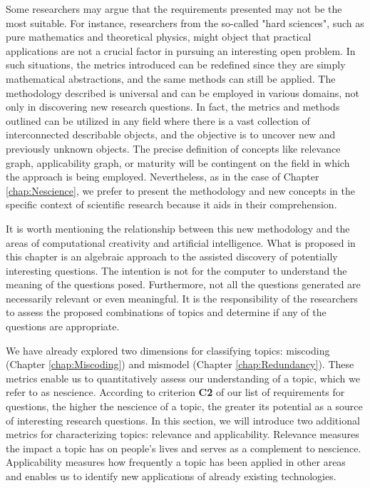 \bigskip

Some researchers may argue that the requirements presented may not be the most suitable. For instance, researchers from the so-called "hard sciences", such as pure mathematics and theoretical physics, might object that practical applications are not a crucial factor in pursuing an interesting open problem. In such situations, the metrics introduced can be redefined since they are simply mathematical abstractions, and the same methods can still be applied. The methodology described is universal and can be employed in various domains, not only in discovering new research questions. In fact, the metrics and methods outlined can be utilized in any field where there is a vast collection of interconnected describable objects, and the objective is to uncover new and previously unknown objects. The precise definition of concepts like relevance graph, applicability graph, or maturity will be contingent on the field in which the approach is being employed. Nevertheless, as in the case of Chapter \ref{chap:Nescience}, we prefer to present the methodology and new concepts in the specific context of scientific research because it aids in their comprehension.

It is worth mentioning the relationship between this new methodology and the areas of computational creativity and artificial intelligence. What is proposed in this chapter is an algebraic approach to the assisted discovery of potentially interesting questions. The intention is not for the computer to understand the meaning of the questions posed. Furthermore, not all the questions generated are necessarily relevant or even meaningful. It is the responsibility of the researchers to assess the proposed combinations of topics and determine if any of the questions are appropriate.

We have already explored two dimensions for classifying topics: miscoding (Chapter \ref{chap:Miscoding}) and mismodel (Chapter \ref{chap:Redundancy}). These metrics enable us to quantitatively assess our understanding of a topic, which we refer to as nescience. According to criterion \textbf{C2} of our list of requirements for questions, the higher the nescience of a topic, the greater its potential as a source of interesting research questions. In this section, we will introduce two additional metrics for characterizing topics: relevance and applicability. Relevance measures the impact a topic has on people's lives and serves as a complement to nescience. Applicability measures how frequently a topic has been applied in other areas and enables us to identify new applications of already existing technologies.

